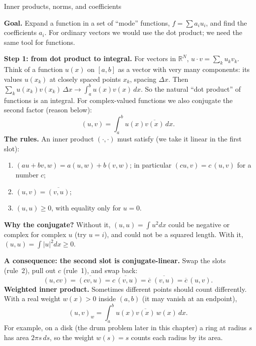 \documentclass[11pt]{beamer}
\begin{document}
\begin{frame}[allowframebreaks=1.00]{Inner products, norms, and coefficients}
\footnotesize

\textbf{Goal.} Expand a function in a set of ``mode'' functions, \(f=\sum a_iu_i\), and find the coefficients
\(a_i\). For ordinary vectors we would use the dot product; we need the same tool for functions.

\textbf{Step 1: from dot product to integral.} For vectors in \(\mathbb R^N\),
\(u\cdot v=\sum_{k}u_kv_k\). Think of a function \(u(x)\) on \([a,b]\) as a vector with very many
components: its values \(u(x_k)\) at closely spaced points \(x_k\), spacing \(\Delta x\). Then
\(\sum_ku(x_k)v(x_k)\,\Delta x\to\int_a^bu(x)v(x)\,dx\). So the natural ``dot product'' of functions is an
integral. For complex-valued functions we also conjugate the second factor (reason below):
\begin{equation}
  (u,v)=\int_a^b u(x)\overline{v(x)}\,dx.
  \label{eq:l2ip}
\end{equation}
\textbf{The rules.} An inner product \((\cdot,\cdot)\) must satisfy (we take it linear in the first slot):
\begin{enumerate}
  \item \((au+bv,w)=a(u,w)+b(v,w)\); in particular \((cu,v)=c\,(u,v)\) for a number \(c\);
  \item \((u,v)=\overline{(v,u)}\);
  \item \((u,u)\geq0\), with equality only for \(u=0\).
\end{enumerate}
\par\framebreak\par
\textbf{Why the conjugate?} Without it, \((u,u)=\int u^2dx\) could be negative or complex for complex \(u\)
(try \(u=i\)), and could not be a squared length. With it, \((u,u)=\int|u|^2dx\ge0\).

\textbf{A consequence: the second slot is conjugate-linear.} Swap the slots (rule~2), pull out \(c\)
(rule~1), and swap back:
\begin{equation}
  (u,cv)=\overline{(cv,u)}=\overline{c\,(v,u)}
  =\overline{c}\;\overline{(v,u)}=\overline{c}\,(u,v).
  \label{eq:ip-conj-linear-second}
\end{equation}
\textbf{Weighted inner product.} Sometimes different points should count differently. With a real
weight \(w(x)>0\) inside \((a,b)\) (it may vanish at an endpoint),
\begin{equation}
  (u,v)_w=\int_a^b u(x)\overline{v(x)}\,w(x)\,dx.
  \label{eq:wip}
\end{equation}
For example, on a disk (the drum problem later in this chapter) a ring at radius $s$
has area $2\pi s\,ds$, so the weight $w(s)=s$ counts each radius by its area.


\end{frame}
\end{document}

